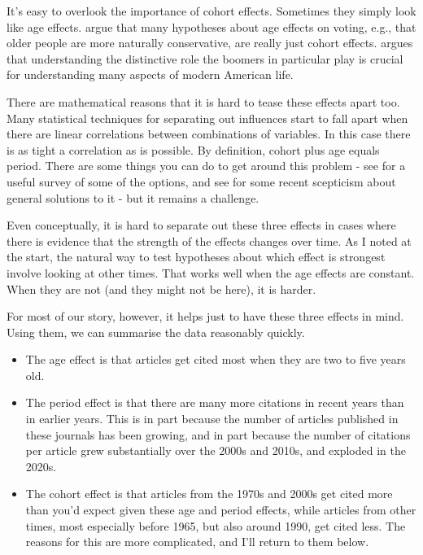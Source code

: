 \documentclass[
]{ergoclass}
\providecommand{\tightlist}{%
  \setlength{\itemsep}{0pt}\setlength{\parskip}{0pt}}
\begin{document}
It's easy to overlook the importance of cohort effects. Sometimes they
simply look like age effects. \citet{GhitzaEtAl2023} argue that many
hypotheses about age effects on voting, e.g., that older people are more
naturally conservative, are really just cohort effects. \citet{Bump2023}
argues that understanding the distinctive role the boomers in particular
play is crucial for understanding many aspects of modern American life.

There are mathematical reasons that it is hard to tease these effects
apart too. Many statistical techniques for separating out influences
start to fall apart when there are linear correlations between
combinations of variables. In this case there is as tight a correlation
as is possible. By definition, cohort plus age equals period. There are
some things you can do to get around this problem - see
\citet{KeyesEtAl2010} for a useful survey of some of the options, and
see \citet{Rohrer2025} for some recent scepticism about general
solutions to it - but it remains a challenge.

Even conceptually, it is hard to separate out these three effects in
cases where there is evidence that the strength of the effects changes
over time. As I noted at the start, the natural way to test hypotheses
about which effect is strongest involve looking at other times. That
works well when the age effects are constant. When they are not (and
they might not be here), it is harder.

For most of our story, however, it helps just to have these three
effects in mind. Using them, we can summarise the data reasonably
quickly.

\begin{itemize}
\tightlist
\item
  The age effect is that articles get cited most when they are two to
  five years old.
\item
  The period effect is that there are many more citations in recent
  years than in earlier years. This is in part because the number of
  articles published in these journals has been growing, and in part
  because the number of citations per article grew substantially over
  the 2000s and 2010s, and exploded in the 2020s.
\item
  The cohort effect is that articles from the 1970s and 2000s get cited
  more than you'd expect given these age and period effects, while
  articles from other times, most especially before 1965, but also
  around 1990, get cited less. The reasons for this are more
  complicated, and I'll return to them below.
\end{itemize}
\end{document}
